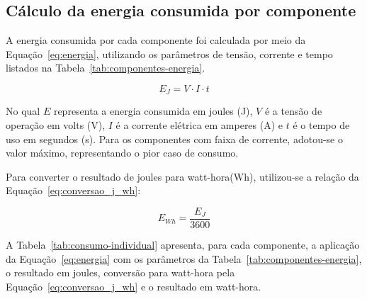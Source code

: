 \subsection{Cálculo da energia consumida por componente}

A energia consumida por cada componente foi calculada por meio da 
Equação~\ref{eq:energia}, utilizando os parâmetros de tensão, corrente 
e tempo listados na Tabela~\ref{tab:componentes-energia}.

\begin{equation}
E_{J} = V \cdot I \cdot t
\label{eq:energia}
\end{equation}

No qual $E$ representa a energia consumida em joules (J), $V$ é a tensão 
de operação em volts (V), $I$ é a corrente elétrica em amperes (A) e 
$t$ é o tempo de uso em segundos (s). Para os componentes com faixa de 
corrente, adotou-se o valor máximo, representando o pior caso de consumo.

Para converter o resultado de joules para watt-hora(Wh), utilizou-se a 
relação da Equação~\ref{eq:conversao_j_wh}:

\begin{equation}
E_{Wh} = \frac{E_{J}}{3600}
\label{eq:conversao_j_wh}
\end{equation}

A Tabela~\ref{tab:consumo-individual} apresenta, para cada componente, 
a aplicação da Equação~\ref{eq:energia} com os parâmetros da 
Tabela~\ref{tab:componentes-energia}, o resultado em joules,
conversão para watt-hora pela Equação~\ref{eq:conversao_j_wh} e o resultado em watt-hora.

\begin{table}[h]
\centering
\caption{Consumo energético individual dos componentes em 18 minutos}
\label{tab:consumo-individual}
\end{table}

